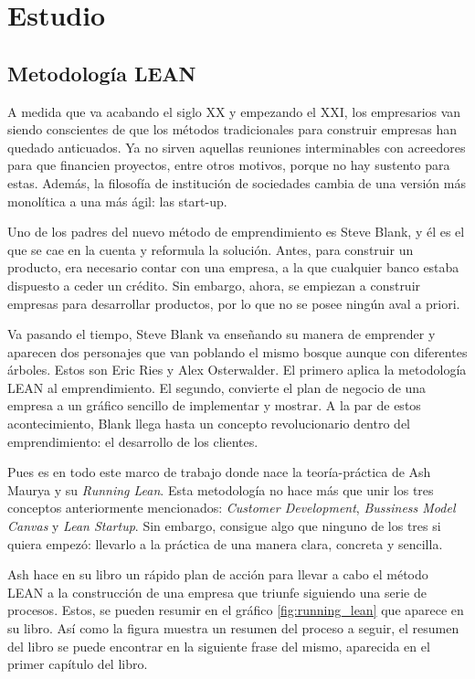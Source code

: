
\chapter{Estudio}\label{estudio}
\section{Metodología LEAN}\label{sec:metodologia_lean}

A medida que va acabando el siglo XX y empezando el XXI, los empresarios van siendo conscientes de que los métodos tradicionales para construir empresas han quedado anticuados. Ya no sirven aquellas reuniones interminables con acreedores para que financien proyectos, entre otros motivos, porque no hay sustento para estas. Además, la filosofía de institución de sociedades cambia de una versión más monolítica a una más ágil: las start-up.

Uno de los padres del nuevo método de emprendimiento es Steve Blank, y él es el que se cae en la cuenta y reformula la solución. Antes, para construir un producto, era necesario contar con una empresa, a la que cualquier banco estaba dispuesto a ceder un crédito. Sin embargo, ahora, se empiezan a construir empresas para desarrollar productos, por lo que no se posee ningún aval a priori.

Va pasando el tiempo, Steve Blank va enseñando su manera de emprender y aparecen dos personajes que van poblando el mismo bosque aunque con diferentes árboles. Estos son Eric Ries y Alex Osterwalder. El primero aplica la metodología LEAN al emprendimiento. El segundo, convierte el plan de negocio de una empresa a un gráfico sencillo de implementar y mostrar. A la par de estos acontecimiento, Blank llega hasta un concepto revolucionario dentro del emprendimiento: el desarrollo de los clientes.

Pues es en todo este marco de trabajo donde nace la teoría-práctica de Ash Maurya y su \textit{Running Lean}. Esta metodología no hace más que unir los tres conceptos anteriormente mencionados: \textit{Customer Development}, \textit{Bussiness Model Canvas} y \textit{Lean Startup}. Sin embargo, consigue algo que ninguno de los tres si quiera empezó: llevarlo a la práctica de una manera clara, concreta y sencilla.

Ash hace en su libro un rápido plan de acción para llevar a cabo el método LEAN a la construcción de una empresa que triunfe siguiendo una serie de procesos. Estos, se pueden resumir en el gráfico \ref{fig:running_lean} que aparece en su libro. Así como la figura muestra un resumen del proceso a seguir, el resumen del libro se puede encontrar en la siguiente frase del mismo, aparecida en el primer capítulo del libro.

